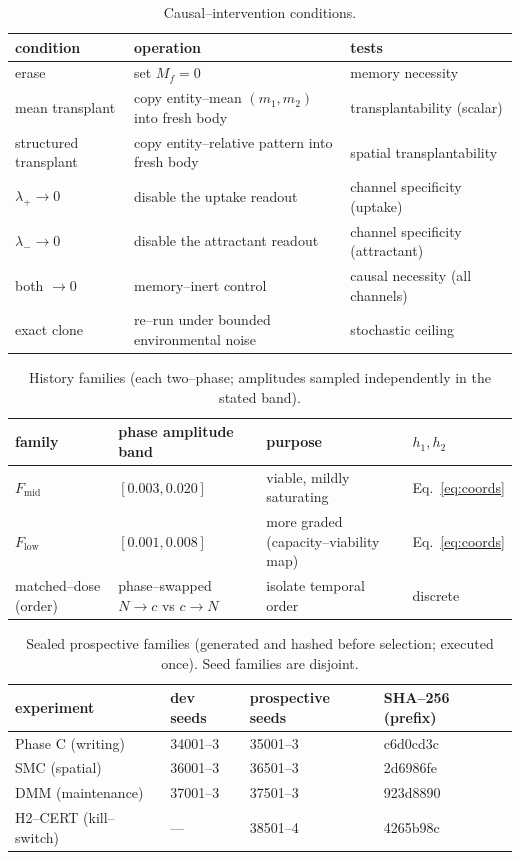 \documentclass[11pt]{article}
\begin{document}
\begin{table}[t]\centering\small
\caption{Causal--intervention conditions.}
\label{tab:interventions}
\begin{tabular}{@{}lp{5.6cm}l@{}}\toprule
condition & operation & tests\\\midrule
erase & set $M_f=0$ & memory necessity\\
mean transplant & copy entity--mean $(m_1,m_2)$ into fresh body & transplantability (scalar)\\
structured transplant & copy entity--relative pattern into fresh body & spatial transplantability\\
$\lambda_+\!\to\!0$ & disable the uptake readout & channel specificity (uptake)\\
$\lambda_-\!\to\!0$ & disable the attractant readout & channel specificity (attractant)\\
both $\to 0$ & memory--inert control & causal necessity (all channels)\\
exact clone & re--run under bounded environmental noise & stochastic ceiling\\\bottomrule
\end{tabular}
\end{table}
\begin{table}[t]\centering\small
\caption{History families (each two--phase; amplitudes sampled independently in the stated band).}
\label{tab:histories}
\begin{tabular}{@{}llll@{}}\toprule
family & phase amplitude band & purpose & $h_1,h_2$\\\midrule
$F_{\mathrm{mid}}$ & $[0.003,0.020]$ & viable, mildly saturating & Eq.~\eqref{eq:coords}\\
$F_{\mathrm{low}}$ & $[0.001,0.008]$ & more graded (capacity--viability map) & Eq.~\eqref{eq:coords}\\
matched--dose (order) & phase--swapped $N{\to}c$ vs $c{\to}N$ & isolate temporal order & discrete\\\bottomrule
\end{tabular}
\end{table}
\begin{table}[t]\centering\small
\caption{Sealed prospective families (generated and hashed before selection; executed once). Seed families are disjoint.}
\label{tab:families}
\begin{tabular}{@{}llll@{}}\toprule
experiment & dev seeds & prospective seeds & SHA--256 (prefix)\\\midrule
Phase C (writing) & 34001--3 & 35001--3 & c6d0cd3c\\
SMC (spatial) & 36001--3 & 36501--3 & 2d6986fe\\
DMM (maintenance) & 37001--3 & 37501--3 & 923d8890\\
H2--CERT (kill--switch) & --- & 38501--4 & 4265b98c\\\bottomrule
\end{tabular}
\end{table}
\end{document}
